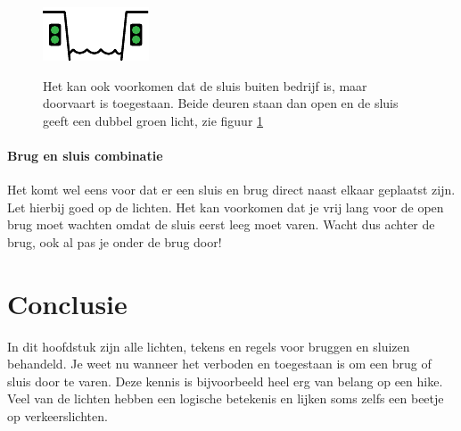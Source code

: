 \vspace{-0.35cm}
\begin{figure}[H]
	\centering
	\begin{minipage}[b]{0.18\textwidth}	
		\includegraphics[width=\textwidth]{Hoofdstukken/Bruggen/pdf/sluis_buiten_dienst_open.pdf}
		\caption{}
		\label{pic:sluis:buiten_toegestaan}
	\end{minipage}
	\hfill
	\begin{minipage}[t]{0.75\textwidth}
		\vspace{-2cm}
		Het kan ook voorkomen dat de sluis buiten bedrijf is, maar doorvaart is toegestaan. Beide deuren staan dan open en de sluis geeft een dubbel groen licht, zie figuur \ref{pic:sluis:buiten_toegestaan}
	\end{minipage}
\end{figure}

\paragraph{Brug en sluis combinatie}
Het komt wel eens voor dat er een sluis en brug direct naast elkaar geplaatst zijn. Let hierbij goed op de lichten. Het kan voorkomen dat je vrij lang voor de open brug moet wachten omdat de sluis eerst leeg moet varen. Wacht dus achter de brug, ook al pas je onder de brug door!

\section{Conclusie}
In dit hoofdstuk zijn alle lichten, tekens en regels voor bruggen en sluizen behandeld. Je weet nu wanneer het verboden en toegestaan is om een brug of sluis door te varen. Deze kennis is bijvoorbeeld heel erg van belang op een hike. Veel van de lichten hebben een logische betekenis en lijken soms zelfs een beetje op verkeerslichten. 
